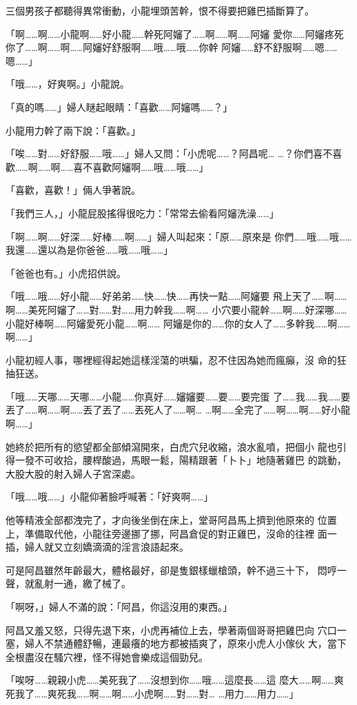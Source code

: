 三個男孩子都聽得異常衝動，小龍埋頭苦幹，恨不得要把雞巴插斷算了。

「啊……啊……小龍啊……好小龍……幹死阿嬸了……啊……啊……阿嬸
愛你……阿嬸疼死你了……啊……啊……阿嬸好舒服啊……哦……哦……你幹
阿嬸……舒不舒服啊……嗯……嗯……」

「哦……，好爽啊。」小龍說。

「真的嗎……」婦人瞇起眼睛：「喜歡……阿嬸嗎……？」

小龍用力幹了兩下說：「喜歡。」

「唉……對……好舒服……哦……」婦人又問：「小虎呢……？阿昌呢…
…？你們喜不喜歡……啊……啊……喜不喜歡阿嬸啊……哦……哦……」

「喜歡，喜歡！」倆人爭著說。

「我們三人，」小龍屁股搖得很吃力：「常常去偷看阿嬸洗澡……」

「啊……啊……好深……好棒……啊……」婦人叫起來：「原……原來是
你們……哦……哦……我還……還以為是你爸爸……哦……哦……」

「爸爸也有。」小虎招供說。

「哦……哦……好小龍……好弟弟……快……快……再快一點……阿嬸要
飛上天了……啊……啊……美死阿嬸了……對……對……用力幹我……啊……
小穴要小龍幹……啊……好深哪……小龍好棒啊……阿嬸愛死小龍……啊……
阿嬸是你的……你的女人了……多幹我……啊……啊……」

小龍初經人事，哪裡經得起她這樣淫蕩的哄騙，忍不住因為她而瘋癲，沒
命的狂抽狂送。

「哦……天哪……天哪……小龍……你真好……嬸嬸要……要……要完蛋
了……我……我……要丟了……啊……啊……丟了丟了……丟死人了……啊…
…啊……全完了……啊……啊……好小龍啊……」

她終於把所有的慾望都全部傾瀉開來，白虎穴兒收縮，浪水亂噴，把個小
龍也引得一發不可收拾，腰桿酸過，馬眼一鬆，陽精跟著「卜卜」地隨著雞巴
的跳動，大股大股的射入婦人子宮深處。

「哦……哦……」小龍仰著臉呼喊著：「好爽啊……」

他等精液全部都洩完了，才向後坐倒在床上，堂哥阿昌馬上擠到他原來的
位置上，準備取代他，小龍往旁邊挪了挪，阿昌倉促的對正雞巴，沒命的往裡
面一插，婦人就又立刻嬌滴滴的淫言浪語起來。

可是阿昌雖然年齡最大，體格最好，卻是隻銀樣蠟槍頭，幹不過三十下，
悶哼一聲，就亂射一通，繳了械了。

「啊呀，」婦人不滿的說：「阿昌，你這沒用的東西。」

阿昌又羞又怒，只得先退下來，小虎再補位上去，學著兩個哥哥把雞巴向
穴口一塞，婦人不禁通體舒暢，連最癢的地方都被插爽了，原來小虎人小傢伙
大，當下全根盡沒在騷穴裡，怪不得她會樂成這個勁兒。

「唉呀……親親小虎……美死我了……沒想到你……哦……這麼長……這
麼大……啊……爽死我了……爽死我……啊……啊……小虎啊……對……對…
…用力……用力……」

